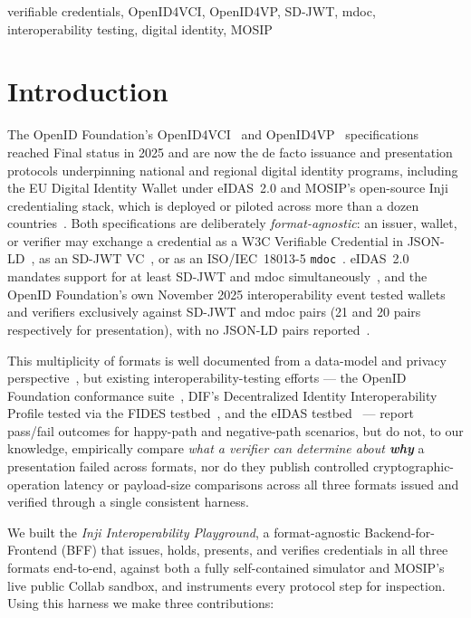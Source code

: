 \documentclass[conference]{IEEEtran}
\begin{document}
\begin{IEEEkeywords}
verifiable credentials, OpenID4VCI, OpenID4VP, SD-JWT, mdoc, interoperability testing, digital identity, MOSIP
\end{IEEEkeywords}

\section{Introduction}

The OpenID Foundation's OpenID4VCI~\cite{openid4vci} and OpenID4VP~\cite{openid4vp} specifications reached Final status in 2025 and are now the de facto issuance and presentation protocols underpinning national and regional digital identity programs, including the EU Digital Identity Wallet under eIDAS~2.0 and MOSIP's open-source Inji credentialing stack, which is deployed or piloted across more than a dozen countries~\cite{mosip}. Both specifications are deliberately \emph{format-agnostic}: an issuer, wallet, or verifier may exchange a credential as a W3C Verifiable Credential in JSON-LD~\cite{vcdm2}, as an SD-JWT VC~\cite{sdjwtvc}, or as an ISO/IEC~18013-5 \texttt{mdoc}~\cite{iso18013-5}. eIDAS~2.0 mandates support for at least SD-JWT and mdoc simultaneously~\cite{eidas-formats}, and the OpenID Foundation's own November 2025 interoperability event tested wallets and verifiers exclusively against SD-JWT and mdoc pairs (21 and 20 pairs respectively for presentation), with no JSON-LD pairs reported~\cite{oidf-interop-nov2025}.

This multiplicity of formats is well documented from a data-model and privacy perspective~\cite{mazzocca-survey, buldini-csdjwt}, but existing interoperability-testing efforts --- the OpenID Foundation conformance suite~\cite{oidf-conformance}, DIF's Decentralized Identity Interoperability Profile tested via the FIDES testbed~\cite{diip-fides}, and the eIDAS testbed~\cite{eidas-testbed} --- report pass/fail outcomes for happy-path and negative-path scenarios, but do not, to our knowledge, empirically compare \emph{what a verifier can determine about \textbf{why}} a presentation failed across formats, nor do they publish controlled cryptographic-operation latency or payload-size comparisons across all three formats issued and verified through a single consistent harness.

We built the \emph{Inji Interoperability Playground}, a format-agnostic Backend-for-Frontend (BFF) that issues, holds, presents, and verifies credentials in all three formats end-to-end, against both a fully self-contained simulator and MOSIP's live public Collab sandbox, and instruments every protocol step for inspection. Using this harness we make three contributions:
\end{document}
